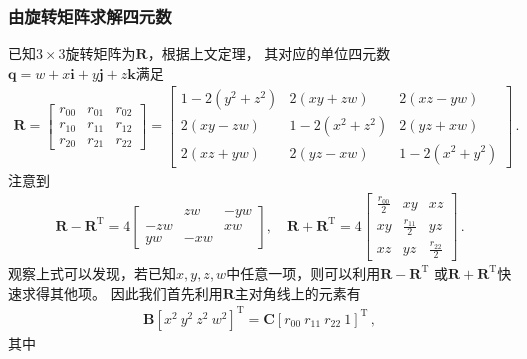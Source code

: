 \subsubsection{由旋转矩阵求解四元数}
已知$3\times3$旋转矩阵为$\bm R$，根据上文定理，
其对应的单位四元数$\bm q=w+x\mathbf{i}+y\mathbf{j}+z\mathbf{k}$满足
\begin{align}
    \bm R=\left[\begin{array}{ccc}
            r_{00} & r_{01} & r_{02} \\
            r_{10} & r_{11} & r_{12} \\
            r_{20} & r_{21} & r_{22}
        \end{array}\right]
    =\left[\begin{array}{ccc}
            1-2(y^2+z^2) & 2(xy+zw)     & 2(xz-yw)     \\
            2(xy-zw)     & 1-2(x^2+z^2) & 2(yz+xw)     \\
            2(xz+yw)     & 2(yz-xw)     & 1-2(x^2+y^2)
        \end{array}\right]\, .
\end{align}
注意到
\begin{align}\label{eq:02ex.1}
    \bm R-\bm R^\mathrm{T}=4\left[\begin{array}{ccc}
                & zw  & -yw \\
            -zw &     & xw  \\
            yw  & -xw &
        \end{array}\right],\quad
    \bm R+\bm R^\mathrm{T}=4\left[\begin{array}{ccc}
            \displaystyle\frac{r_{00}}{2} & xy                            & xz                            \\
            xy                            & \displaystyle\frac{r_{11}}{2} & yz                            \\
            xz                            & yz                            & \displaystyle\frac{r_{22}}{2}
        \end{array}\right]\, .
\end{align}
观察上式可以发现，若已知$x,y,z,w$中任意一项，则可以利用$\bm R-\bm R^\mathrm{T}$
或$\bm R+\bm R^\mathrm{T}$快速求得其他项。
因此我们首先利用$\bm R$主对角线上的元素有
\begin{align}
    \bm B[x^2\ y^2\ z^2\ w^2]^\mathrm{T}=\bm C[r_{00}\ r_{11}\ r_{22}\ 1]^\mathrm{T}\, ,
\end{align}
其中
